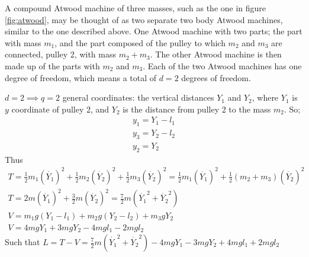 \documentclass[11pt,a4paper]{report}
\newcounter{excount}[chapter]
\newenvironment{exercise}[1][]{\addtocounter{excount}{1} \noindent {\bf Problem
    \arabic{excount} \ \ #1}\hspace{2mm}}{\vspace{4mm}}
\begin{document}
\begin{exercise}
A compound Atwood machine of three masses, such as the one in figure \ref{fig:atwood}, may be thought of as two separate two body Atwood machines, similar to the one described above. One Atwood machine with two parts; the part with mass $m_1$, and the part composed of the pulley to which $m_2$ and $m_3$ are connected, pulley 2, with mass $m_2+m_3$. The other Atwood machine is then made up of the parts with $m_2$ and $m_3$. Each of the two Atwood machines has one degree of freedom, which means a total of $d=2$ degrees of freedom. \par 
$d=2 \implies q=2$ general coordinates: the vertical distances $Y_1$ and $Y_2$, where $Y_1$ is $y$ coordinate of pulley 2, and $Y_2$ is the distance from pulley 2 to the mass $m_2$. So;
\begin{align*}
y_1=Y_1-l_1 \\
y_3=Y_2-l_2\\
y_2=Y_2
\end{align*}
Thus
\begin{align*}
T=\frac{1}{2}m_1(\dot{Y_1})^2+\frac{1}{2}m_2(\dot{Y_2})^2+\frac{1}{2}m_3(\dot{Y_2})^2=\frac{1}{2}m_1(\dot{Y_1})^2+\frac{1}{2}(m_2+m_3)(\dot{Y_2})^2 \\
T=2m(\dot{Y_1})^2+\frac{3}{2}m(\dot{Y_2})^2=\frac{7}{2}m(\dot{Y_1}^2+\dot{Y_2}^2) \\
V=m_1g(Y_1-l_1 )+m_2g(Y_2-l_2)+m_3gY_2 \\
V=4mgY_1+3mgY_2-4mgl_1-2mgl_2 
\end{align*}
Such that $L=T-V= \frac{7}{2}m(\dot{Y_1}^2+\dot{Y_2}^2) -4mgY_1-3mgY_2+4mgl_1+2mgl_2 $


\end{exercise}
\end{document}
